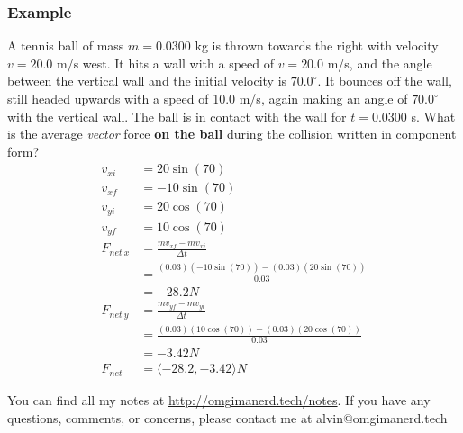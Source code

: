 \documentclass{math}
\begin{document}
\subsubsection*{Example}
A tennis ball of mass \( m = 0.0300 \) kg is thrown towards the right with
velocity \( v = 20.0 \) m/s west. It hits a wall with a speed of \( v = 20.0 \)
m/s, and the angle between the vertical wall and the initial velocity is
\( 70.0^{\circ} \). It bounces off the wall, still headed upwards with a speed
of 10.0 m/s, again making an angle of \( 70.0^{\circ} \) with the vertical wall.
The ball is in contact with the wall for \( t = 0.0300 \) s. What is the average
\textit{vector} force \textbf{on the ball} during the collision written in
component form?
\begin{align*}
  v_{xi} &= 20\sin(70) \\
  v_{xf} &= -10\sin(70) \\
  v_{yi} &= 20\cos(70) \\
  v_{yf} &= 10\cos(70) \\
  F_{net~x} &= \frac{mv_{xf}-mv_{xi}}{\Delta{t}} \\
  &= \frac{(0.03)(-10\sin(70))-(0.03)(20\sin(70))}{0.03} \\
  &= -28.2N \\
  F_{net~y} &= \frac{mv_{yf}-mv_{yi}}{\Delta{t}} \\
  &= \frac{(0.03)(10\cos(70))-(0.03)(20\cos(70))}{0.03} \\
  &= -3.42N \\
  F_{net} &= \langle-28.2,-3.42\rangle N
\end{align*}

\begin{center}
  You can find all my notes at \url{http://omgimanerd.tech/notes}. If you have
  any questions, comments, or concerns, please contact me at
  alvin@omgimanerd.tech
\end{center}
\end{document}
